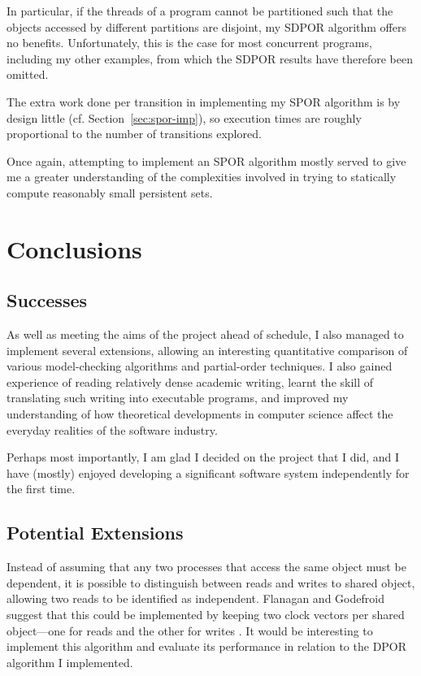 \documentclass[12pt,a4paper,twoside,openright]{report}
\begin{document}
In particular, if the threads of
a program cannot be partitioned
such that the objects accessed by different
partitions are disjoint, my SDPOR algorithm
offers no benefits. Unfortunately, this
is the case for most concurrent programs,
including my other examples, from which
the SDPOR results have therefore been omitted.

The extra work done per transition
in implementing my SPOR
algorithm is by design little
(cf. Section~\ref{sec:spor-imp}), so
execution times are roughly proportional
to the number of transitions explored.

Once again, attempting to implement
an SPOR algorithm mostly served to give
me a greater understanding
of the complexities involved in trying to
statically compute reasonably small persistent sets.

\chapter{Conclusions}

\section{Successes}

As well as meeting the aims of the
project ahead of schedule, I also
managed to implement several
extensions, allowing an
interesting quantitative
comparison of various
model-checking algorithms
and partial-order techniques.
I also gained experience of
reading relatively dense academic
writing, learnt the skill of
translating such writing into
executable programs, and
improved my understanding
of how theoretical developments
in computer science affect the
everyday realities of the
software industry.

Perhaps most importantly,
I am glad I decided on the
project that I did, and
I have (mostly) enjoyed
developing a significant
software system independently
for the first time.

\section{Potential Extensions}
Instead of assuming that any
two processes that access the
same object must be dependent,
it is possible to distinguish
between reads and writes to
shared object, allowing
two reads to be identified
as independent.
Flanagan and Godefroid suggest
that this could be implemented
by keeping two clock vectors per
shared object---one for reads and
the other for writes \cite{flan05}.
It would
be interesting to implement
this algorithm and evaluate its
performance in relation to the
DPOR algorithm I implemented.
\end{document}
